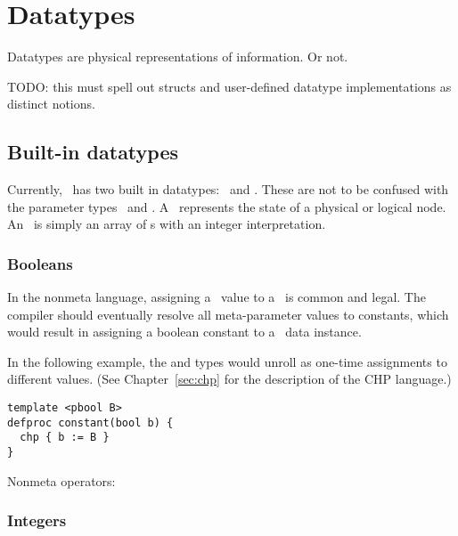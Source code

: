 

\chapter{Datatypes}
\label{sec:datatypes}

Datatypes are physical representations of information.  
Or not.  

TODO: this must spell out structs and user-defined datatype implementations
as distinct notions.  


\section{Built-in datatypes}
\label{sec:datatypes:builtin}

Currently, \hac\ has two built in datatypes: \bool\ and \int.  
These are not to be confused with the parameter types \pbool\ and \pint.  
A \bool\ represents the state of a physical or logical node.  
An \int\ is simply an array of \bool{}s with an integer interpretation.  

\subsection{Booleans}
\label{sec:datatypes:builtin:bool}

In the nonmeta language, assigning a \pbool\ value to a \bool\ 
is common and legal.  
The compiler should eventually resolve all meta-parameter values to
constants, which would result in assigning a boolean constant
to a \bool\ data instance.  

In the following example, the  and
 types would unroll as one-time
assignments to different values.  
(See Chapter~\ref{sec:chp} for the description of the CHP language.)

\begin{verbatim}
template <pbool B>
defproc constant(bool b) {
  chp { b := B }
}
\end{verbatim}

Nonmeta operators:

\subsection{Integers}
\label{sec:datatypes:builtin:int}

